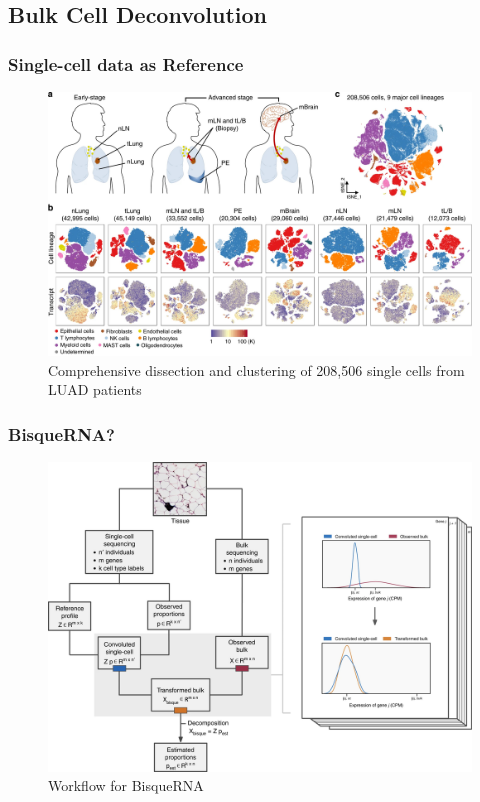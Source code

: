 \documentclass{beamer}
\begin{document}
    \subsection{Bulk Cell Deconvolution}
    \begin{frame}
        \frametitle{Single-cell data as Reference}

        \begin{figure}
            \includegraphics[width=0.8 \linewidth]{figures/CIBERSORTx/reference.jpg}
            \caption{Comprehensive dissection and clustering of 208,506 single cells from LUAD patients \protect\cite{singlecell1}}
        \end{figure}
    \end{frame}

    \begin{frame}
        \frametitle{BisqueRNA?}

        \begin{figure}
            \includegraphics[width=0.6 \linewidth]{figures/Workflow/Bisque.jpg}
            \caption{Workflow for BisqueRNA \protect\cite{Bisque1}}
        \end{figure}
    \end{frame}
\end{document}
